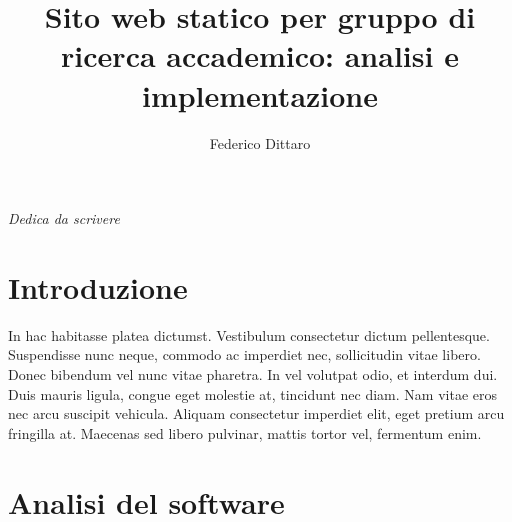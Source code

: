 \documentclass[target=bach,aauheader=]{thud}
\title{Sito web statico per gruppo di ricerca accademico: analisi e implementazione}
\author{Federico Dittaro}
\begin{document}
\maketitle

\newpage 
\begin{flushright}
     
    \textit{Dedica da scrivere}
\end{flushright} 
 
\tableofcontents



\mainmatter



\chapter{Introduzione}
In hac habitasse platea dictumst. Vestibulum consectetur dictum pellentesque. Suspendisse nunc neque, commodo ac imperdiet nec, sollicitudin vitae libero. Donec bibendum vel nunc vitae pharetra. In vel volutpat odio, et interdum dui. Duis mauris ligula, congue eget molestie at, tincidunt nec diam. Nam vitae eros nec arcu suscipit vehicula. Aliquam consectetur imperdiet elit, eget pretium arcu fringilla at. Maecenas \cite{Knu86} sed libero pulvinar, mattis tortor vel, fermentum enim.

\chapter{Analisi del software}

\end{document}
